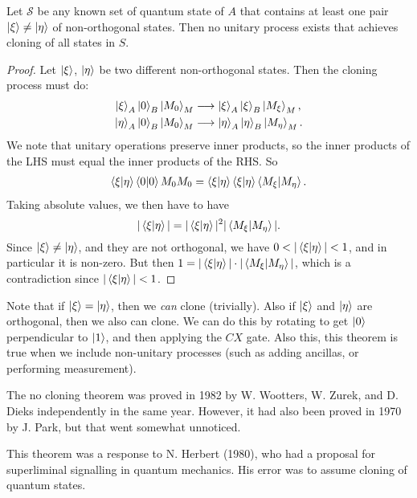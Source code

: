 \documentclass[a4paper]{article}
\begin{document}
\begin{theorem}
	Let $\mathcal{S}$ be any known set of quantum state of $A$ that contains at least one pair $\ket{\xi} \neq \ket{\eta}$ of non-orthogonal states.
	Then no unitary process exists that achieves cloning of all states in $S$.
\end{theorem}
\begin{proof}
	Let $\ket{\xi}$, $\ket{\eta}$ be two different non-orthogonal states. Then the cloning process must do:
	\begin{align*}
		\ket{\xi}_A \ket{0}_B \ket{M_0}_M &\longrightarrow \ket{\xi}_A \ket{\xi}_B \ket{M_\xi}_M, \\
\ket{\eta}_A \ket{0}_B \ket{M_0}_M&\longrightarrow \ket{\eta}_A \ket{\eta}_B \ket{M_{\eta}}_M.
	\end{align*}
	We note that unitary operations preserve inner products, so the inner products of the LHS must equal the inner products of the RHS. So
	\begin{align*}
		\ip{\xi}{\eta} \ip{0}{0} {M_0}{M_0} = \ip{\xi}{\eta} \ip{\xi}{\eta} \ip{M_\xi}{M_\eta}.
	\end{align*}
	Taking absolute values, we then have to have
	$$
	|\ip{\xi}{\eta}| = |\ip{\xi}{\eta}|^2 |\ip{M_\xi}{M_\eta}|.
	$$
	Since $\ket{\xi} \neq \ket{\eta}$, and they are not orthogonal, we have $0 < |\ip{\xi}{\eta}| < 1$, and in particular it is non-zero. But then $1 = |\ip{\xi}{\eta}| \cdot |\ip{M_\xi}{M_\eta}|$, which is a contradiction since $|\ip{\xi}{\eta}| < 1$.
\end{proof}

\begin{remark}
	Note that if $\ket{\xi} = \ket{\eta}$, then we \emph{can} clone (trivially). Also if $\ket{\xi}$ and $\ket{\eta}$ are orthogonal, then we also can clone. We can do this by rotating to get $\ket{0}$ perpendicular to $\ket{1}$, and then applying the $CX$ gate.
	Also this, this theorem is true when we include non-unitary processes (such as adding ancillas, or performing measurement).
\end{remark}

	The no cloning theorem was proved in 1982 by W. Wootters, W. Zurek, and D. Dieks independently in the same year. However, it had also been proved in 1970 by J. Park, but that went somewhat unnoticed.

	This theorem was a response to N. Herbert (1980), who had a proposal for superliminal signalling in quantum mechanics. His error was to assume cloning of quantum states.
\end{document}
